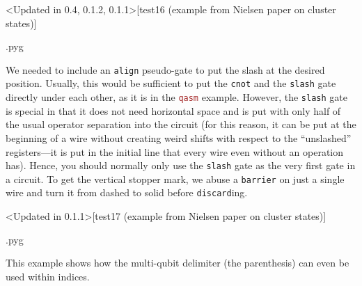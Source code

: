 \documentclass{scrartcl}
\makeatletter
\newenvironment{codeexample}{%
   \VerbatimEnvironment%
   \let\FVB@VerbatimOut\minted@FVB@VerbatimOut
   \let\FVE@VerbatimOut\minted@FVE@VerbatimOut
   \minted@configlang{tex}%
   \minted@fvset
   \begin{VerbatimOut}[codes={\catcode`\^^I=12},firstline,lastline]{\minted@jobname.pyg}%
}{
   \end{VerbatimOut}%
   \minted@langlinenoson%
   \savebox\codeexamplebox{ \minted@jobname.pyg}%
   \ifdim\wd\codeexamplebox>\dimexpr.5\linewidth-3mm\relax%
      \wd\codeexamplebox=.5\linewidth%
   \else%
      \wd\codeexamplebox=\dimexpr\wd\codeexamplebox+3mm\relax%
   \fi%
   \noindent\begin{minipage}{\wd\codeexamplebox}%
      \centering%
      \usebox\codeexamplebox%
   \end{minipage}%
   \begin{minipage}{\dimexpr\linewidth-\wd\codeexamplebox\relax}%
      \expandafter\minted@pygmentize\expandafter{\minted@lang}%
   \end{minipage}%
   \minted@langlinenosoff%
   \par%
}
\def\pkg#1{\textcolor{brown}{\texttt{#1}}}
\def\ttlink{\link\texttt}
\makeatother
\begin{document}
         \begin{example}<Updated in 0.4, 0.1.2, 0.1.1>[test16 (example from Nielsen paper on cluster states)]
            \begin{codeexample}
            \end{codeexample}
            We needed to include an \ttlink{align} pseudo\hyp gate to put the slash at the desired position.
            Usually, this would be sufficient to put the \ttlink{cnot} and the \ttlink{slash} gate directly under each other, as it is in the \pkg{qasm} example.
            However, the \ttlink{slash} gate is special in that it does not need horizontal space and is put with only half of the usual operator separation into the circuit (for this reason, it can be put at the beginning of a wire without creating weird shifts with respect to the ``unslashed'' registers---it is put in the initial line that every wire even without an operation has).
            Hence, you should normally only use the \ttlink{slash} gate as the very first gate in a circuit.
            To get the vertical stopper mark, we abuse a \ttlink{barrier} on just a single wire and turn it from dashed to solid before \ttlink{discard}ing.
         \end{example}

         \begin{example}<Updated in 0.1.1>[test17 (example from Nielsen paper on cluster states)]
            \begin{codeexample}
            \end{codeexample}
            This example shows how the multi\hyp qubit delimiter (the parenthesis) can even be used within indices.
         \end{example}
\end{document}
